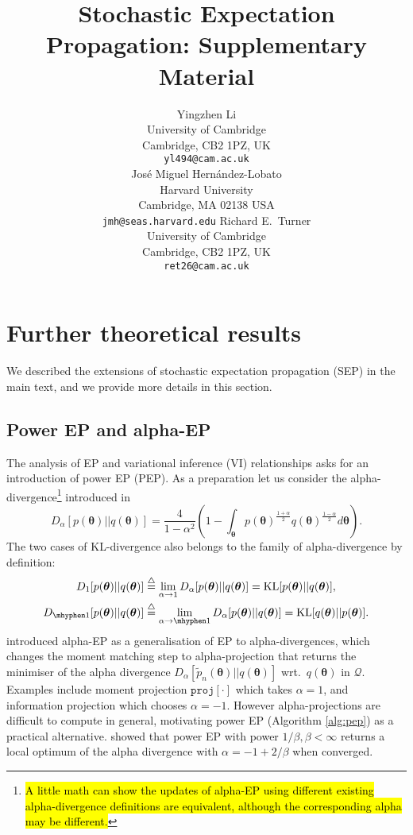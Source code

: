\documentclass{article} %
\title{Stochastic Expectation Propagation: Supplementary Material}
\author{
Yingzhen Li \\
University of Cambridge\\
Cambridge, CB2 1PZ, UK \\
\texttt{yl494@cam.ac.uk} \\
\And
Jos\'e Miguel Hern\'andez-Lobato\\
Harvard University \\
Cambridge, MA 02138 USA \\
\texttt{jmh@seas.harvard.edu}
\And
Richard E.~Turner \\
University of Cambridge\\
Cambridge, CB2 1PZ, UK \\
\texttt{ret26@cam.ac.uk} \\
}
\begin{document}
\maketitle

\appendix

\section{Further theoretical results}
We described the extensions of stochastic expectation propagation (SEP) in the main text, and we provide more details in this section.

\subsection{Power EP and alpha-EP}
The analysis of EP and variational inference (VI) relationships asks for an introduction of power EP (PEP). As a preparation let us consider the alpha-divergence\footnote{\hl{A little math can show the updates of alpha-EP using different existing alpha-divergence definitions are equivalent, although the corresponding alpha may be different.}} introduced in \cite{amari:ig1985}
\begin{equation}
D_{\alpha}[p(\bm{\theta}) || q(\bm{\theta})] = \frac{4}{1 - \alpha^2} 
		\left( 1 - \int_{\bm{\theta}} p(\bm{\theta})^{ \frac{1+\alpha}{2}} q(\bm{\theta})^{ \frac{1- \alpha}{2}} d\bm{\theta} \right).
\end{equation} 
The two cases of KL-divergence also belongs to the family of alpha-divergence by definition:
\begin{align}
D_{1}[p(\bm{\theta})||q(\bm{\theta})] &\buildrel\triangle\over = \lim_{\alpha \rightarrow 1} D_{\alpha}[p(\bm{\theta})||q(\bm{\theta})]  = \mathrm{KL}[p(\bm{\theta}) || q(\bm{\theta})], \\
D_{ \mhyphen 1}[p(\bm{\theta})||q(\bm{\theta})] &\buildrel\triangle\over = \lim_{\alpha \rightarrow \mhyphen 1} D_{\alpha}[p(\bm{\theta}) || q(\bm{\theta})]  = \mathrm{KL}[q(\bm{\theta}) || p(\bm{\theta})].
\end{align}
\cite{minka:powerep} introduced alpha-EP as a generalisation of EP to alpha-divergences, which changes the moment matching step to alpha-projection \cite{amari:alpha_proj} that returns the minimiser of the alpha divergence $D_{\alpha}[\tilde{p}_n(\bm{\theta}) || q(\bm{\theta})]$ wrt.~$q(\bm{\theta})$ in $\mathcal{Q}$. Examples include moment projection $\mathtt{proj}[\cdot]$ which takes $\alpha = 1$, and information projection which chooses $\alpha = -1$. However alpha-projections are difficult to compute in general, motivating power EP (Algorithm \ref{alg:pep}) as a practical alternative. \cite{minka:powerep} showed that power EP with power $1 / \beta, \beta < \infty$ returns a local optimum of the alpha divergence with $\alpha = -1 + 2 / \beta$ when converged. 
\end{document}
